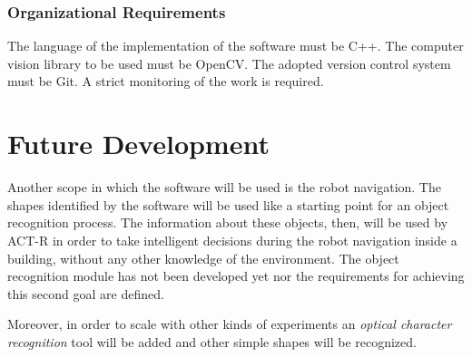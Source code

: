 			\subsubsection{Organizational Requirements}
			The language of the implementation of the software must be C++. 
			The computer vision library to be used must be OpenCV.
			The adopted version control system must be Git.
			A strict monitoring of the work is required.

	\section{Future Development}
		Another scope in which the software will be used is the robot navigation. 
		The shapes identified by the software will be used like a starting point for an object recognition process. 
		The information about these objects, then, will be used by ACT-R in order to take intelligent decisions during the robot navigation inside a building, without any other knowledge of the environment. 
		The object recognition module has not been developed yet nor the requirements for achieving this second goal are defined. 	

		Moreover, in order to scale with other kinds of experiments an \emph{optical character recognition} tool will be added and other simple shapes will be recognized.



